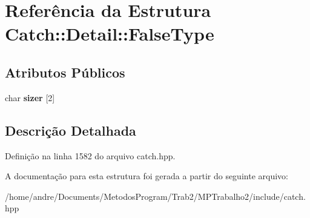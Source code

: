 \hypertarget{structCatch_1_1Detail_1_1FalseType}{}\section{Referência da Estrutura Catch\+:\+:Detail\+:\+:False\+Type}
\label{structCatch_1_1Detail_1_1FalseType}
\subsection*{Atributos Públicos}
\begin{DoxyCompactItemize}
\item 
char {\bfseries sizer} \mbox{[}2\mbox{]}\hypertarget{structCatch_1_1Detail_1_1FalseType_abc1a730e197d6f7750ae8aaf47b63477}{}\label{structCatch_1_1Detail_1_1FalseType_abc1a730e197d6f7750ae8aaf47b63477}

\end{DoxyCompactItemize}


\subsection{Descrição Detalhada}


Definição na linha 1582 do arquivo catch.\+hpp.



A documentação para esta estrutura foi gerada a partir do seguinte arquivo\+:\begin{DoxyCompactItemize}
\item 
/home/andre/\+Documents/\+Metodos\+Program/\+Trab2/\+M\+P\+Trabalho2/include/catch.\+hpp\end{DoxyCompactItemize}

